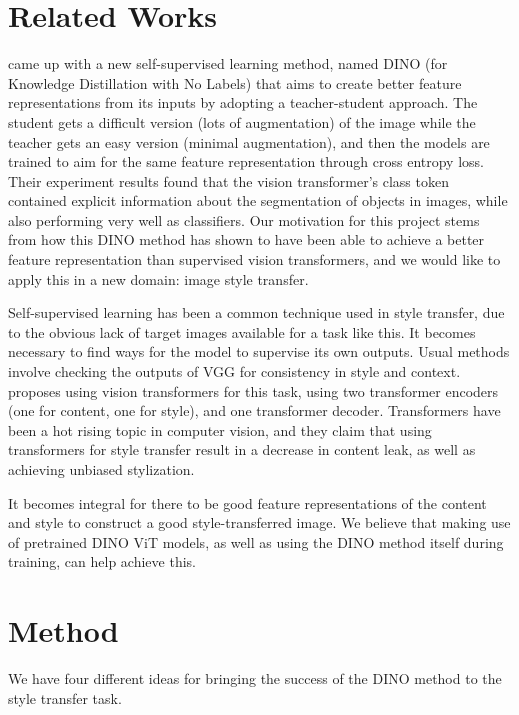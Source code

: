 \documentclass{article}
\begin{document}
\section{Related Works}

\cite{DINO} came up with a new self-supervised learning method, named DINO (for Knowledge Distillation with No Labels) that aims to create better feature representations from its inputs by adopting a teacher-student approach. The student gets a difficult version (lots of augmentation) of the image while the teacher gets an easy version (minimal augmentation), and then the models are trained to aim for the same feature representation through cross entropy loss. Their experiment results found that the vision transformer's class token contained explicit information about the segmentation of objects in images, while also performing very well as classifiers. Our motivation for this project stems from how this DINO method has shown to have been able to achieve a better feature representation than supervised vision transformers, and we would like to apply this in a new domain: image style transfer.

Self-supervised learning has been a common technique used in style transfer, due to the obvious lack of target images available for a task like this. It becomes necessary to find ways for the model to supervise its own outputs. Usual methods \cite{CNNStyleTransfer} involve checking the outputs of VGG for consistency in style and context. \cite{ImageStyleTransformer} proposes using vision transformers for this task, using two transformer encoders (one for content, one for style), and one transformer decoder. Transformers have been a hot rising topic in computer vision, and they claim that using transformers for style transfer result in a decrease in content leak, as well as achieving unbiased stylization.

It becomes integral for there to be good feature representations of the content and style to construct a good style-transferred image. We believe that making use of pretrained DINO ViT models, as well as using the DINO method itself during training, can help achieve this.


\section{Method}

We have four different ideas for bringing the success of the DINO method to the style transfer task.
\end{document}
